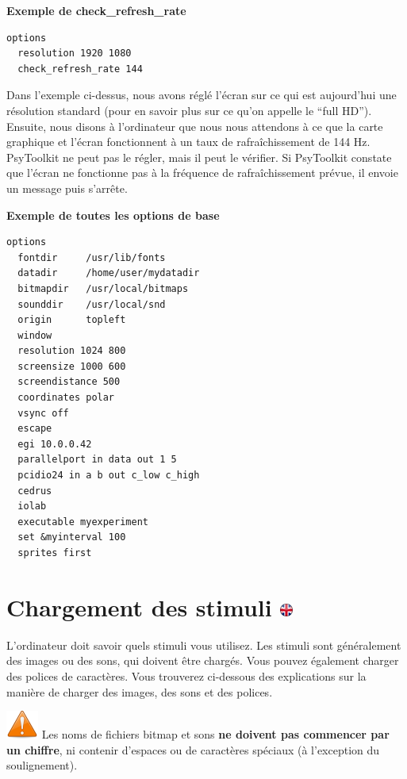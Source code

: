 \documentclass[
]{book}
\begin{document}
\textbf{Exemple de check\_refresh\_rate}

\begin{verbatim}
options
  resolution 1920 1080
  check_refresh_rate 144
\end{verbatim}

Dans l'exemple ci-dessus, nous avons réglé l'écran sur ce qui est aujourd'hui une résolution standard (pour en savoir plus sur ce qu'on appelle le ``full HD''). Ensuite, nous disons à l'ordinateur que nous nous attendons à ce que la carte graphique et l'écran fonctionnent à un taux de rafraîchissement de 144 Hz. PsyToolkit ne peut pas le régler, mais il peut le vérifier. Si PsyToolkit constate que l'écran ne fonctionne pas à la fréquence de rafraîchissement prévue, il envoie un message puis s'arrête.

\textbf{Exemple de toutes les options de base}

\begin{verbatim}
options
  fontdir     /usr/lib/fonts
  datadir     /home/user/mydatadir
  bitmapdir   /usr/local/bitmaps
  sounddir    /usr/local/snd
  origin      topleft
  window
  resolution 1024 800
  screensize 1000 600
  screendistance 500
  coordinates polar
  vsync off
  escape
  egi 10.0.0.42
  parallelport in data out 1 5
  pcidio24 in a b out c_low c_high
  cedrus
  iolab
  executable myexperiment
  set &myinterval 100
  sprites first
\end{verbatim}

\hypertarget{chargement-des-stimuli}{%
\section[Chargement des stimuli ]{\texorpdfstring{Chargement des stimuli \href{https://www.psytoolkit.org/doc3.4.0/syntax.html\#loadingstimuli}{\protect\includegraphics{img/ukflag.png}}}{Chargement des stimuli }}\label{chargement-des-stimuli}}

L'ordinateur doit savoir quels stimuli vous utilisez. Les stimuli sont généralement des images ou des sons, qui doivent être chargés. Vous pouvez également charger des polices de caractères. Vous trouverez ci-dessous des explications sur la manière de charger des images, des sons et des polices.

\includegraphics{img/attention.png} Les noms de fichiers bitmap et sons \textbf{ne doivent pas commencer par un chiffre}, ni contenir d'espaces ou de caractères spéciaux (à l'exception du soulignement).
\end{document}
